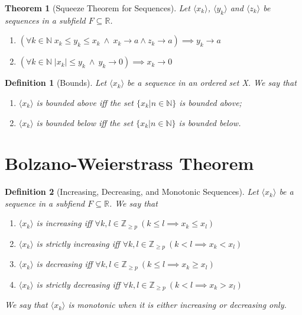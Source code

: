 \documentclass[11pt, oneside]{book}
\theoremstyle{break}
\newtheorem{thm}{Theorem}[section]
\newtheorem{defn}{Definition}[section]
\newcommand{\bb}[1]{\mathbb{#1}}			%
\begin{document}
\begin{thm}[Squeeze Theorem for Sequences]\label{squeeze_seq}
	Let $\langle x_k \rangle$, $\langle y_k \rangle$ and $\langle z_k \rangle$ be sequences in a subfield $F \subseteq \bb{R}$.
	\begin{enumerate}
		\item $(\forall k \in \bb{N} \; x_k \leq y_k \leq x_k \> \land \> x_k \to a \land z_k \to a) \implies y_k \to a$
		\item $(\forall k \in \bb{N} \; |x_k| \leq y_k \> \land \> y_k \to 0) \implies x_k \to 0$
	\end{enumerate}
\end{thm}

\begin{defn}[Bounds]
	Let $\langle x_k \rangle$ be a sequence in an ordered set X. We say that
	\begin{enumerate}
		\item $\langle x_k \rangle$ is bounded above iff the set $\{x_k | n \in \bb{N} \}$ is bounded above;
		\item $\langle x_k \rangle$ is bounded below iff the set $\{x_k | n \in \bb{N} \}$ is bounded below.
	\end{enumerate}
\end{defn}


\section{Bolzano-Weierstrass Theorem}

\begin{defn}[Increasing, Decreasing, and Monotonic Sequences]
	Let $\langle x_k \rangle$ be a sequence in a subfiend $F \subseteq \bb{R}$. We say that
	\begin{enumerate}
		\item $\langle x_k \rangle$ is increasing iff $\forall k, l \in \bb{Z}_{\geq p} \> (k \leq l \implies x_k \leq x_l)$
		\item $\langle x_k \rangle$ is strictly increasing iff $\forall k, l \in \bb{Z}_{\geq p} \> (k < l \implies x_k < x_l)$
		\item $\langle x_k \rangle$ is decreasing iff $\forall k, l \in \bb{Z}_{\geq p} \> (k \leq l \implies x_k \geq x_l)$
		\item $\langle x_k \rangle$ is strictly decreasing iff $\forall k, l \in \bb{Z}_{\geq p} \> (k < l \implies x_k > x_l)$
	\end{enumerate}
	We say that $\langle x_k \rangle$ is monotonic when it is either increasing or decreasing only.
\end{defn}
\end{document}
